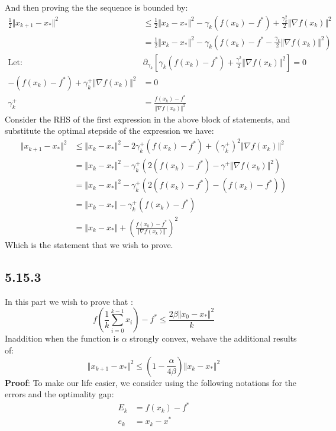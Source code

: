 \documentclass[]{article}
\begin{document}
        And then proving the the sequence is bounded by: 
        \begin{align*}\tag{5.15.2.1}\label{eqn:5.15.2.1}
            \frac{1}{2}\Vert x_{k + 1} - x_*\Vert^2 &\le 
            \frac{1}{2}\Vert x_k - x_*\Vert^2 - \gamma_k(f(x_k) - f^*) + 
            \frac{\gamma_k^2}{2}\Vert \nabla f(x_k) \Vert^2
            \\
            &=  
            \frac{1}{2}\Vert x_k - x_*\Vert^2 - \gamma_k 
            \left(
                f(x_k) - f^* - \frac{\gamma_k}{2}\Vert \nabla f(x_k)\Vert^2
            \right)
            \\
            \text{Let: }& 
            \partial_{\gamma_k} \left[ 
                \gamma_k(f(x_k) - f^*) + \frac{\gamma^2}{2}\Vert \nabla f(x_k)\Vert^2
            \right]  = 0
            \\
            -(f(x_k) - f^*) + \gamma_k^+ \Vert \nabla f(x_k)\Vert^2 &= 0
            \\
            \gamma_k^+ &= \frac{f(x_k) - f^*}{\Vert \nabla f(x_k)\Vert^2}
        \end{align*}
        Consider the RHS of the first expression in the above block of statements, and substitute the optimal stepside of the expression we have: 
        \begin{align*}\tag{5.15.2.2}\label{eqn:5.15.2.2}
            \Vert x_{k + 1} - x_*\Vert^2 &\le 
            \Vert x_k - x_*\Vert^2 - 2\gamma_k^+(f(x_k) - f^*) + 
            (\gamma_k^+)^2\Vert \nabla f(x_k) \Vert^2
            \\
            &= 
            \Vert x_k  - x_*\Vert^2 - \gamma^+_k(2(f(x_k) - f^*) - \gamma^+ \Vert \nabla f(x_k)\Vert^2)
            \\
            &= 
            \Vert x_k  - x_*\Vert^2 - \gamma^+_k(2(f(x_k) - f^*) - (f(x_k) - f^*))
            \\
            &= \Vert x_k - x_*\Vert - \gamma^+_k(f(x_k) - f^*)
            \\
            &= 
            \Vert x_k - x_*\Vert + 
            \left(\frac{f(x_k) - f^*}{\Vert \nabla f(x_k)\Vert}\right)^2
        \end{align*}
        Which is the statement that we wish to prove. 
    \subsection*{5.15.3}
    In this part we wish to prove that : 
    $$
        f\left(
            \frac{1}{k} \sum_{i = 0}^{k - 1}x_i  
        \right) - f^* \le \frac{2\beta \Vert x_0 - x_*\Vert^2}{k}
    $$
    Inaddition when the function is $\alpha$ strongly convex, wehave the additional results of: 
    $$
        \Vert x_{k + 1} - x_*\Vert^2 \le 
        \left(
            1 - \frac{\alpha}{4\beta}
        \right)
        \Vert x_k - x_*\Vert^2
    $$
    \textbf{Proof}: 
    To make our life easier, we consider using the following notations for the errors and the optimality gap: 
    \begin{align*}\tag{5.15.3.1}\label{eqn:5.15.3.1}
        E_k &= f(x_k) - f^*
        \\
        e_k &= x_k - x^*
    \end{align*}
\end{document}
